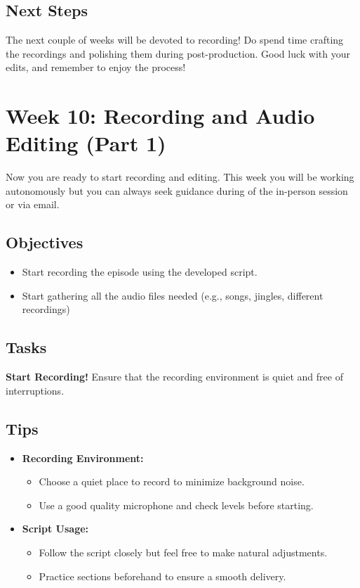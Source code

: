 \documentclass[
  letterpaper,
  DIV=11,
  numbers=noendperiod]{scrreprt}
\providecommand{\tightlist}{%
  \setlength{\itemsep}{0pt}\setlength{\parskip}{0pt}}\usepackage{longtable,booktabs,array}
\begin{document}
\section{Next Steps}\label{next-steps-9}

The next couple of weeks will be devoted to recording! Do spend time
crafting the recordings and polishing them during post-production. Good
luck with your edits, and remember to enjoy the process!

\chapter{Week 10: Recording and Audio Editing (Part
1)}\label{week-10-recording-and-audio-editing-part-1-1}

Now you are ready to start recording and editing. This week you will be
working autonomously but you can always seek guidance during of the
in-person session or via email.

\section{Objectives}\label{objectives-6}

\begin{itemize}
\tightlist
\item
  Start recording the episode using the developed script.
\item
  Start gathering all the audio files needed (e.g., songs, jingles,
  different recordings)
\end{itemize}

\section{Tasks}\label{tasks-3}

\textbf{Start Recording!} Ensure that the recording environment is quiet
and free of interruptions.

\section{Tips}\label{tips}

\begin{itemize}
\tightlist
\item
  \textbf{Recording Environment:}

  \begin{itemize}
  \tightlist
  \item
    Choose a quiet place to record to minimize background noise.
  \item
    Use a good quality microphone and check levels before starting.
  \end{itemize}
\item
  \textbf{Script Usage:}

  \begin{itemize}
  \tightlist
  \item
    Follow the script closely but feel free to make natural adjustments.
  \item
    Practice sections beforehand to ensure a smooth delivery.
  \end{itemize}
\end{itemize}
\end{document}
